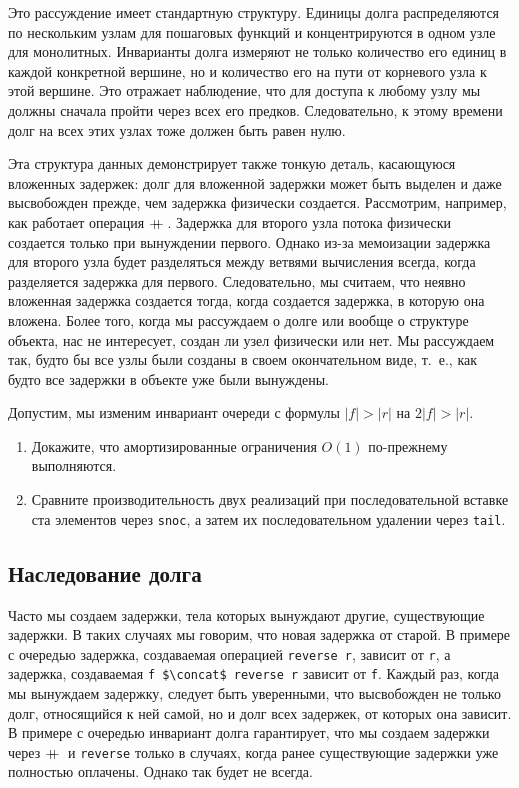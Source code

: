 Это рассуждение имеет стандартную структуру. Единицы долга
распределяются по нескольким узлам для пошаговых функций и
концентрируются в одном узле для монолитных. Инварианты долга
измеряют не только количество его единиц в каждой конкретной вершине,
но и количество его на пути от корневого узла к этой вершине. Это
отражает наблюдение, что для доступа к любому узлу мы должны сначала
пройти через всех его предков. Следовательно, к этому времени долг на
всех этих узлах тоже должен быть равен нулю.

Эта структура данных демонстрирует также тонкую деталь, касающуюся
вложенных задержек: долг для вложенной задержки может быть выделен и
даже высвобожден прежде, чем задержка физически создается. Рассмотрим,
например, как работает операция $+\!\!\!+\,$. Задержка для второго узла
потока физически создается только при вынуждении первого. Однако из-за
мемоизации задержка для второго узла будет разделяться между ветвями
вычисления всегда, когда разделяется задержка для
первого. Следовательно, мы считаем, что неявно вложенная задержка
создается тогда, когда создается задержка, в которую она вложена.
Более того, когда мы рассуждаем о долге или вообще о структуре
объекта, нас не интересует, создан ли узел физически или нет. Мы
рассуждаем так, будто бы все узлы были созданы в своем
окончательном виде, т.~е., как будто все задержки в объекте уже были
вынуждены.

\begin{exercise}\label{ex:6.2}
  Допустим, мы изменим инвариант очереди с формулы $|f| > |r|$ на $2|f| >
  |r|$.
  \begin{enumerate}
  \item Докажите, что амортизированные ограничения $O(1)$ по-прежнему
    выполняются.
  \item Сравните производительность двух реализаций при
    последовательной вставке ста элементов через \lstinline!snoc!, а
    затем их последовательном удалении через \lstinline!tail!.
  \end{enumerate}
\end{exercise}

\subsection{Наследование долга}
\label{sc:6.3.3}

Часто мы создаем задержки, тела которых вынуждают другие, существующие
задержки. В таких случаях мы говорим, что новая задержка
 от старой. В примере с очередью задержка,
создаваемая операцией \lstinline!reverse r!, зависит от \lstinline!r!,
а задержка, создаваемая \lstinline!f $\concat$ reverse r! зависит от
\lstinline!f!.  Каждый раз, когда мы вынуждаем задержку, следует быть
уверенными, что высвобожден не только долг, относящийся к ней самой,
но и долг всех задержек, от которых она зависит. В примере с очередью
инвариант долга гарантирует, что мы создаем задержки через $+\!\!\!+\,$ и
\lstinline!reverse! только в случаях, когда ранее существующие
задержки уже полностью оплачены. Однако так будет не всегда.

